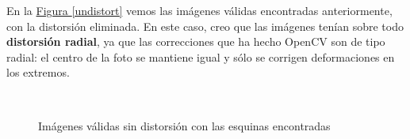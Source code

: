 \documentclass[11pt,a4paper]{article}
\theoremstyle{plain}
\theoremstyle{definition}
\begin{document}
En la \hyperref[undistort]{Figura \ref*{undistort}} vemos las imágenes válidas encontradas anteriormente, con la distorsión eliminada. En este caso, creo que las imágenes tenían sobre todo \textbf{distorsión radial}, ya que las correcciones que ha hecho OpenCV son de tipo radial: el centro de la foto se mantiene igual y sólo se corrigen deformaciones en los extremos.

\begin{figure}[!h]
    \centering
    \mbox{
    }
    \caption{Imágenes válidas sin distorsión con las esquinas encontradas}
    \label{undistortcab}
\end{figure}
\end{document}
